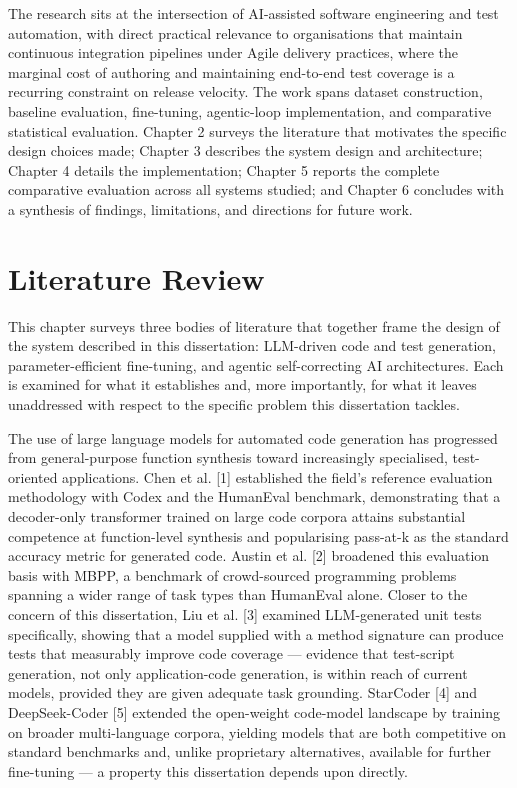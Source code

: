 The research sits at the intersection of AI-assisted software
engineering and test automation, with direct practical relevance to
organisations that maintain continuous integration pipelines under Agile
delivery practices, where the marginal cost of authoring and maintaining
end-to-end test coverage is a recurring constraint on release velocity.
The work spans dataset construction, baseline evaluation, fine-tuning,
agentic-loop implementation, and comparative statistical evaluation.
Chapter 2 surveys the literature that motivates the specific
design choices made; Chapter 3 describes the system design and
architecture; Chapter 4 details the implementation; Chapter 5 reports
the complete comparative evaluation across all systems studied; and
Chapter 6 concludes with a synthesis of findings, limitations, and
directions for future work.

\chapter{Literature Review}

This chapter surveys three bodies of literature that together frame the
design of the system described in this dissertation: LLM-driven code and
test generation, parameter-efficient fine-tuning, and agentic
self-correcting AI architectures. Each is examined for what it
establishes and, more importantly, for what it leaves unaddressed with
respect to the specific problem this dissertation tackles.

The use of large language models for automated code generation has
progressed from general-purpose function synthesis toward increasingly
specialised, test-oriented applications. Chen et al. {[}1{]} established
the field's reference evaluation methodology with Codex and the
HumanEval benchmark, demonstrating that a decoder-only transformer
trained on large code corpora attains substantial competence at
function-level synthesis and popularising pass-at-k as the standard
accuracy metric for generated code. Austin et al. {[}2{]} broadened this
evaluation basis with MBPP, a benchmark of crowd-sourced programming
problems spanning a wider range of task types than HumanEval alone.
Closer to the concern of this dissertation, Liu et al. {[}3{]} examined
LLM-generated unit tests specifically, showing that a model supplied
with a method signature can produce tests that measurably improve code
coverage --- evidence that test-script generation, not only
application-code generation, is within reach of current models, provided
they are given adequate task grounding. StarCoder {[}4{]} and
DeepSeek-Coder {[}5{]} extended the open-weight code-model landscape by
training on broader multi-language corpora, yielding models that are
both competitive on standard benchmarks and, unlike proprietary
alternatives, available for further fine-tuning --- a property this
dissertation depends upon directly.

